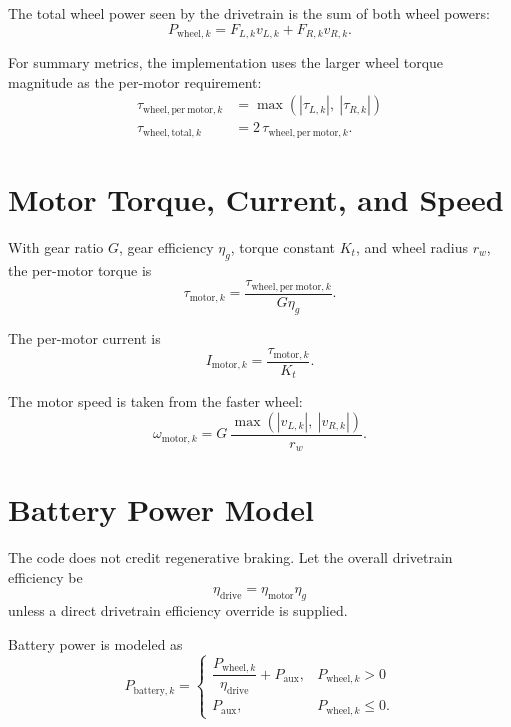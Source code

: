 \documentclass[11pt]{article}
\begin{document}
The total wheel power seen by the drivetrain is the sum of both wheel powers:
\begin{equation}
P_{\mathrm{wheel},k} = F_{L,k}v_{L,k} + F_{R,k}v_{R,k}.
\end{equation}

For summary metrics, the implementation uses the larger wheel torque magnitude as the per-motor requirement:
\begin{align}
\tau_{\mathrm{wheel,per\ motor},k} &= \max(|\tau_{L,k}|,\ |\tau_{R,k}|) \\
\tau_{\mathrm{wheel,total},k} &= 2 \, \tau_{\mathrm{wheel,per\ motor},k}.
\end{align}

\section{Motor Torque, Current, and Speed}
With gear ratio \(G\), gear efficiency \(\eta_g\), torque constant \(K_t\), and wheel radius \(r_w\), the per-motor torque is
\begin{equation}
\tau_{\mathrm{motor},k} = \frac{\tau_{\mathrm{wheel,per\ motor},k}}{G \eta_g}.
\end{equation}

The per-motor current is
\begin{equation}
I_{\mathrm{motor},k} = \frac{\tau_{\mathrm{motor},k}}{K_t}.
\end{equation}

The motor speed is taken from the faster wheel:
\begin{equation}
\omega_{\mathrm{motor},k} =
G \, \frac{\max(|v_{L,k}|,\ |v_{R,k}|)}{r_w}.
\end{equation}

\section{Battery Power Model}
The code does not credit regenerative braking. Let the overall drivetrain efficiency be
\begin{equation}
\eta_{\mathrm{drive}} = \eta_{\mathrm{motor}} \eta_g
\end{equation}
unless a direct drivetrain efficiency override is supplied.

Battery power is modeled as
\begin{equation}
P_{\mathrm{battery},k} =
\begin{cases}
\dfrac{P_{\mathrm{wheel},k}}{\eta_{\mathrm{drive}}} + P_{\mathrm{aux}}, & P_{\mathrm{wheel},k} > 0 \\
P_{\mathrm{aux}}, & P_{\mathrm{wheel},k} \le 0.
\end{cases}
\end{equation}
\end{document}
